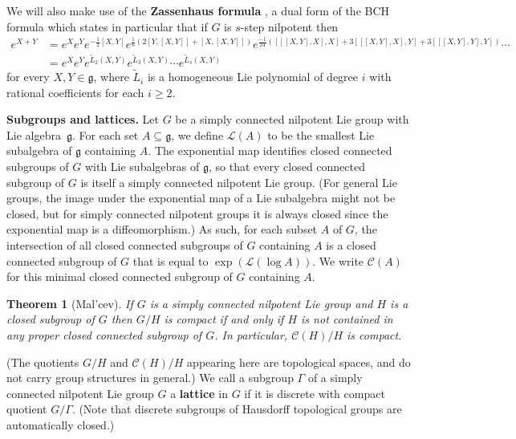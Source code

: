 \documentclass[11pt]{article}
\numberwithin{equation}{section}
\theoremstyle{plain}
\newtheorem{thm}{Theorem}[section]
\theoremstyle{definition}
\theoremstyle{remark}
\numberwithin{equation}{section}
\numberwithin{equation}{section}
\begin{document}
We will also make use of the \textbf{Zassenhaus formula} \cite{casas2012efficient}, a dual form of the BCH formula which states in particular that if $G$ is $s$-step nilpotent then
\begin{align}
e^{X+Y}&= e^{X} e^{Y} e^{-\frac{1}{2} [X,Y]} 
e^{\frac{1}{6}(2[Y,[X,Y]]+ [X,[X,Y]] )} 
e^{\frac{-1}{24}([[[X,Y],X],X] + 3[[[X,Y],X],Y] + 3[[[X,Y],Y],Y]) } \cdots\nonumber\\
&= e^Xe^Y e^{\tilde L_2(X,Y)}e^{\tilde L_3(X,Y)} \cdots e^{\tilde L_s(X,Y)}
\end{align}
for every $X,Y\in \mathfrak{g}$, where $\tilde L_i$ is a homogeneous Lie polynomial of degree $i$ with rational coefficients for each $i\geq 2$.

\medskip

 \textbf{Subgroups and lattices.}
Let $G$ be a simply connected nilpotent Lie group with Lie algebra~$\mathfrak{g}$. For each set $A\subseteq \mathfrak{g}$, we define $\mathscr{L}(A)$ to be the smallest Lie subalgebra of $\mathfrak{g}$ containing $A$. The exponential map identifies closed connected subgroups of $G$ with Lie subalgebras of $\mathfrak{g}$, so that every closed connected subgroup of $G$ is itself a simply connected nilpotent Lie group. (For general Lie groups, the image under the exponential map of a Lie subalgebra might not be closed, but for simply connected nilpotent groups it is always closed since the exponential map is a diffeomorphism.) As such, for each subset $A$ of $G$, the intersection of all closed connected subgroups of $G$ containing $A$ is a closed connected subgroup of $G$ that is equal to $\exp(\mathscr{L}(\log A))$. We write $\mathscr{C}(A)$ for this minimal closed connected subgroup of $G$ containing $A$.

\begin{thm}[Mal'cev]
If $G$ is a simply connected nilpotent Lie group and $H$ is a closed subgroup of $G$ then $G/H$ is compact if and only if $H$ is not contained in any proper closed connected subgroup of $G$. In particular, $\mathscr{C}(H)/H$ is compact.
%
\end{thm}

(The quotients $G/H$ and $\mathscr{C}(H)/H$  appearing here are topological spaces, and do not carry group structures in general.)
We call a subgroup $\Gamma$ of a simply connected nilpotent Lie group $G$ a \textbf{lattice} in $G$ if it is discrete with compact quotient $G/\Gamma$. (Note that discrete subgroups of Hausdorff topological groups are automatically closed.)
\end{document}
